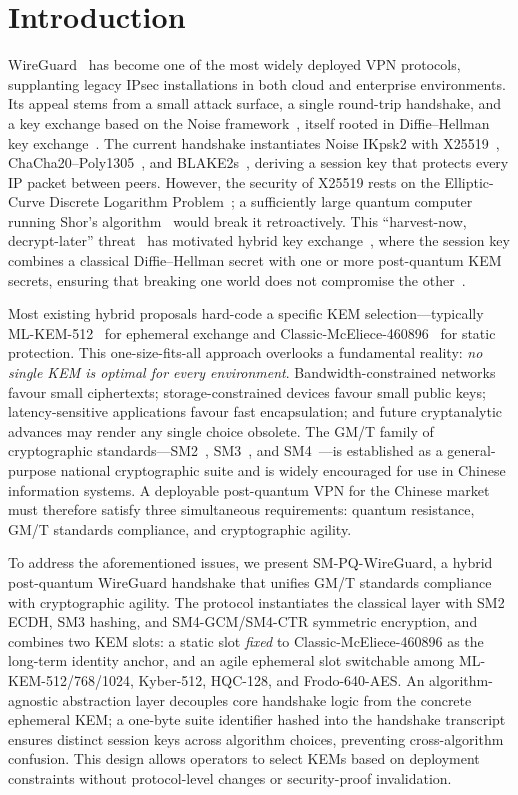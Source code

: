 \documentclass{SCIS2026}
\begin{document}
\section{Introduction}
\label{sec:intro}

WireGuard~\cite{1} has become one of the most
widely deployed VPN protocols, supplanting legacy IPsec installations
in both cloud and enterprise environments.  Its appeal stems from a
small attack surface, a single round-trip handshake, and a key exchange
based on the Noise framework~\cite{2}, itself rooted in
Diffie--Hellman key exchange~\cite{3}.  The current
handshake instantiates Noise \textsf{IKpsk2} with
X25519~\cite{4},
ChaCha20--Poly1305~\cite{5}, and
BLAKE2s~\cite{6}, deriving a session key that protects
every IP packet between peers.  However, the security of X25519 rests
on the Elliptic-Curve Discrete Logarithm Problem~\cite{7,8};
a sufficiently large quantum computer running Shor's
algorithm~\cite{9} would break it retroactively.  This
``harvest-now, decrypt-later'' threat~\cite{10} has
motivated hybrid key
exchange~\cite{11,12,13},
where the session key combines a classical Diffie--Hellman secret with
one or more post-quantum KEM secrets, ensuring that breaking one world
does not compromise the other~\cite{14}.

Most existing hybrid proposals hard-code a specific KEM
selection---typically ML-KEM-512~\cite{15} for ephemeral
exchange and Classic-McEliece-460896~\cite{16} for
static protection.  This one-size-fits-all
approach overlooks a fundamental reality: \emph{no single KEM is
optimal for every environment}.  Bandwidth-constrained networks favour
small ciphertexts; storage-constrained devices favour small public
keys; latency-sensitive applications favour fast encapsulation; and
future cryptanalytic advances may render any single choice obsolete.
The GM/T family of cryptographic standards---SM2~\cite{17,18},
SM3~\cite{19}, and SM4~\cite{20}---is established as a
general-purpose national cryptographic suite and is widely encouraged
for use in Chinese information systems.  A deployable post-quantum VPN
for the Chinese market must therefore satisfy three simultaneous
requirements: quantum resistance, GM/T standards compliance, and
cryptographic agility.

To address the aforementioned issues, we present SM-PQ-WireGuard, a
hybrid post-quantum WireGuard handshake that unifies GM/T standards
compliance with cryptographic agility.  The protocol instantiates the
classical layer with SM2 ECDH, SM3 hashing, and SM4-GCM/SM4-CTR
symmetric encryption, and combines two KEM slots: a static slot
\emph{fixed} to Classic-McEliece-460896 as the long-term identity
anchor, and an agile ephemeral slot switchable among
ML-KEM-512/768/1024, Kyber-512, HQC-128, and Frodo-640-AES.  An
algorithm-agnostic abstraction layer decouples core handshake logic
from the concrete ephemeral KEM; a one-byte suite identifier hashed into the handshake
transcript ensures distinct session keys across algorithm choices,
preventing cross-algorithm confusion.  This design allows operators to
select KEMs based on deployment constraints without protocol-level
changes or security-proof invalidation.
\end{document}
